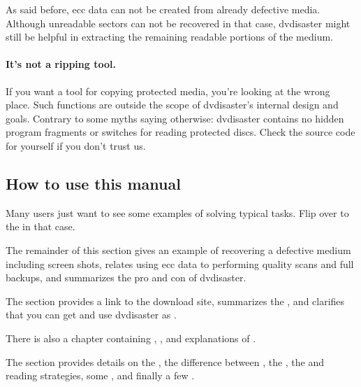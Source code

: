 As said before, ecc data can not be created from already defective media.
Although unreadable sectors can not be recovered in that case, dvdisaster
might still be helpful in extracting the remaining readable portions of the medium. 

\paragraph{It's not a ripping tool.} If you want a tool for copying
protected media, you're looking at the wrong place. Such functions are
outside the scope of dvdisaster's internal design and goals.
Contrary to some myths saying otherwise: dvdisaster contains 
no hidden program fragments or switches for reading protected discs.
Check the source code for yourself if you don't trust us.

 
\subsection{How to use this manual}

Many users just want to see some examples of solving typical tasks. Flip over
to the  in that case. 

\smallskip

The remainder of this section gives an example of recovering a defective medium including
screen shots, relates using ecc data to performing quality scans and full backups,
and summarizes the pro and con of dvdisaster.

\smallskip

The  section provides a link to the download site,
summarizes the ,
and clarifies that you can get and use dvdisaster as
.

\smallskip

There is also a chapter containing ,
, 
and explanations of .

\smallskip

The  section provides details on
the ,
the difference between ,
the ,
the 
and  reading strategies,
some ,
and finally a few .

